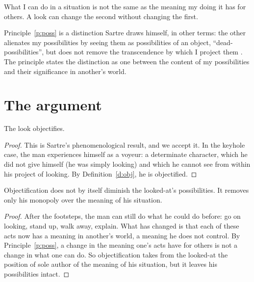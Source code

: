 \documentclass{situationist-preprint}
\begin{document}
\begin{principle}\label{p:poss}
What I can do in a situation is not the same as the meaning my doing it has for others. A look can change the second without changing the first.
\end{principle}

Principle~\ref{p:poss} is a distinction Sartre draws himself, in other terms: the other alienates my possibilities by seeing them as possibilities of an object, \enquote{dead-possibilities}, but does not remove the transcendence by which I project them \citep[Part~III, ch.~1]{Sartre1943}. The principle states the distinction as one between the content of my possibilities and their significance in another's world.

\section{The argument}

\begin{lemma}\label{l:obj}
The look objectifies.
\end{lemma}

\begin{proof}
This is Sartre's phenomenological result, and we accept it. In the keyhole case, the man experiences himself as a voyeur: a determinate character, which he did not give himself (he was simply looking) and which he cannot see from within his project of looking. By Definition~\ref{d:obj}, he is objectified.
\end{proof}

\begin{lemma}\label{l:notalien}
Objectification does not by itself diminish the looked-at's possibilities. It removes only his monopoly over the meaning of his situation.
\end{lemma}

\begin{proof}
After the footsteps, the man can still do what he could do before: go on looking, stand up, walk away, explain. What has changed is that each of these acts now has a meaning in another's world, a meaning he does not control. By Principle~\ref{p:poss}, a change in the meaning one's acts have for others is not a change in what one can do. So objectification takes from the looked-at the position of sole author of the meaning of his situation, but it leaves his possibilities intact.
\end{proof}
\end{document}
